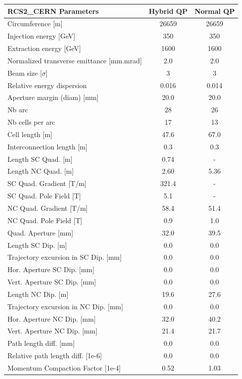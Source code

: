 \begin{tabular}{lcc}
\toprule
RCS2_CERN Parameters & Hybrid QP & Normal QP \\
\midrule
Circumference [m] & 26659 & 26659 \\
Injection energy [GeV] & 350 & 350 \\
Extraction energy [GeV] & 1600 & 1600 \\
Normalized transverse emittance [mm.mrad] & 2.0 & 2.0 \\
Beam size [$\sigma$] & 3 & 3 \\
Relative energy dispersion & 0.016 & 0.014 \\
Aperture margin (diam) [mm] & 20.0 & 20.0 \\
Nb arc & 28 & 26 \\
Nb cells per arc & 17 & 13 \\
Cell length [m] & 47.6 & 67.0 \\
Interconnection length [m] & 0.3 & 0.3 \\
Length SC Quad. [m] & 0.74 & - \\
Length NC Quad. [m] & 2.60 & 5.36 \\
SC Quad. Gradient [T/m] & 321.4 & - \\
SC Quad. Pole Field [T] & 5.1 & - \\
NC Quad. Gradient [T/m] & 58.4 & 51.4 \\
NC Quad. Pole Field [T] & 0.9 & 1.0 \\
Quad. Aperture [mm] & 32.0 & 39.5 \\
Length SC Dip. [m] & 0.0 & 0.0 \\
Trajectory excursion in SC Dip. [mm] & 0.0 & 0.0 \\
Hor. Aperture SC Dip. [mm] & 0.0 & 0.0 \\
Vert. Aperture SC Dip. [mm] & 0.0 & 0.0 \\
Length NC Dip. [m] & 19.6 & 27.6 \\
Trajectory excursion in NC Dip. [mm] & 0.0 & 0.0 \\
Hor. Aperture NC Dip. [mm] & 32.0 & 40.2 \\
Vert. Aperture NC Dip. [mm] & 21.4 & 21.7 \\
Path length diff. [mm] & 0.0 & 0.0 \\
Relative path length diff. [1e-6] & 0.0 & 0.0 \\
Momentum Compaction Factor [1e-4] & 0.52 & 1.03 \\
\bottomrule
\end{tabular}
